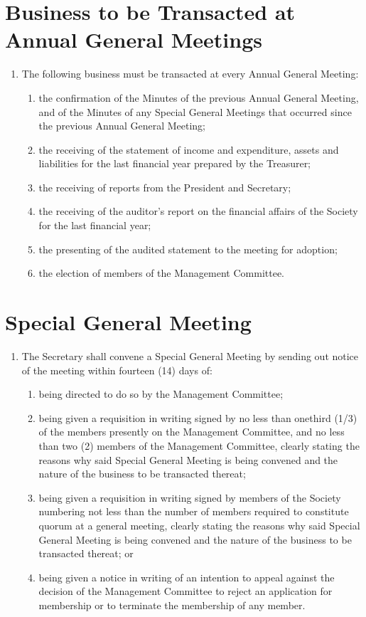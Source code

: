 \documentclass[a4paper]{article}
\newcommand*{\sectionr}[1]{{\raggedright \section{#1}}}
\begin{document}
\sectionr{Business to be Transacted at Annual General Meetings}
\begin{enumerate}
\item The following business must be transacted at every Annual General Meeting:
	\begin{enumerate}
	\item the confirmation of the Minutes of the previous Annual General Meeting, and of the Minutes of any Special General Meetings that occurred since the previous Annual General Meeting;
	\item the receiving of the statement of income and expenditure, assets and liabilities for the last financial year prepared by the Treasurer;
	\item the receiving of reports from the President and Secretary;
	\item the receiving of the auditor's report on the financial affairs of the Society for the last financial year;
	\item the presenting of the audited statement to the meeting for adoption;
	\item the election of members of the Management Committee.
	\end{enumerate}
\end{enumerate}

\sectionr{Special General Meeting}
\begin{enumerate}
\item The Secretary shall convene a Special General Meeting by sending out notice of the meeting within fourteen (14) days of:
	\begin{enumerate}
	\item being directed to do so by the Management Committee;
	\item being given a requisition in writing signed by no less than one\textendash third (1/3) of the members presently on the Management Committee, and no less than two (2) members of the Management Committee, clearly stating the reasons why said Special General Meeting is being convened and the nature of the business to be transacted thereat;
	\item being given a requisition in writing signed by members of the Society numbering not less than the number of members required to constitute quorum at a general meeting, clearly stating the reasons why said Special General Meeting is being convened and the nature of the business to be transacted thereat; or
	\item being given a notice in writing of an intention to appeal against the decision of the Management Committee to reject an application for membership or to terminate the membership of any member.
	\end{enumerate}
\end{enumerate}
\end{document}
